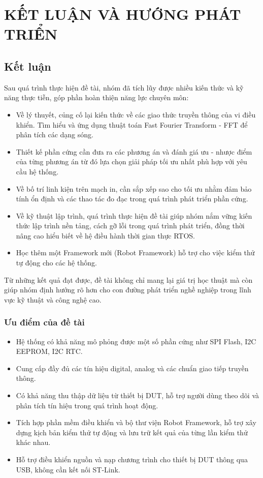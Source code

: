 \chapter{KẾT LUẬN VÀ HƯỚNG PHÁT TRIỂN}

\section{Kết luận}

Sau quá trình thực hiện đề tài, nhóm đã tích lũy được nhiều kiến thức và kỹ năng thực tiễn, góp phần hoàn thiện năng lực chuyên môn:
\begin{itemize}
    \item Về lý thuyết, củng cố lại kiến thức về các giao thức truyền thông của vi điều khiển. Tìm hiểu và ứng dụng thuật toán Fast Fourier Transform - FFT để phân tích các dạng sóng.
    \item Thiết kế phần cứng cần đưa ra các phương án và đánh giá ưu - nhược điểm của từng phương án từ đó lựa chọn giải pháp tối ưu nhất phù hợp với yêu cầu hệ thống.
    \item Về bố trí linh kiện trên mạch in, cần sắp xếp sao cho tối ưu nhằm đảm bảo tính ổn định và các thao tác đo đạc trong quá trình phát triển phần cứng.
    \item Về kỹ thuật lập trình, quá trình thực hiện đề tài giúp nhóm nắm vững kiến thức lập trình nền tảng, cách gỡ lỗi trong quá trình phát triển, đồng thời nâng cao hiểu biết về hệ điều hành thời gian thực RTOS.
    \item Học thêm một Framework mới (Robot Framework) hỗ trợ cho việc kiểm thử tự động cho các hệ thống.
\end{itemize}

Từ những kết quả đạt được, đề tài không chỉ mang lại giá trị học thuật mà còn giúp nhóm định hướng rõ hơn cho con đường phát triển nghề nghiệp trong lĩnh vực kỹ thuật và công nghệ cao.

\subsection{Ưu điểm của đề tài}
\begin{itemize}
    \item Hệ thống có khả năng mô phỏng được một số phần cứng như SPI Flash, I2C EEPROM, I2C RTC.
    \item Cung cấp đầy đủ các tín hiệu digital, analog và các chuẩn giao tiếp truyền thông.
    \item Có khả năng thu thập dữ liệu từ thiết bị DUT, hỗ trợ người dùng theo dõi và phân tích tín hiệu trong quá trình hoạt động.
    \item Tích hợp phần mềm điều khiển và bộ thư viện Robot Framework, hỗ trợ xây dựng kịch bản kiểm thử tự động và lưu trữ kết quả của từng lần kiểm thử khác nhau.
    \item Hỗ trợ điều khiển nguồn và nạp chương trình cho thiết bị DUT thông qua USB, không cần kết nối ST-Link.
\end{itemize}

